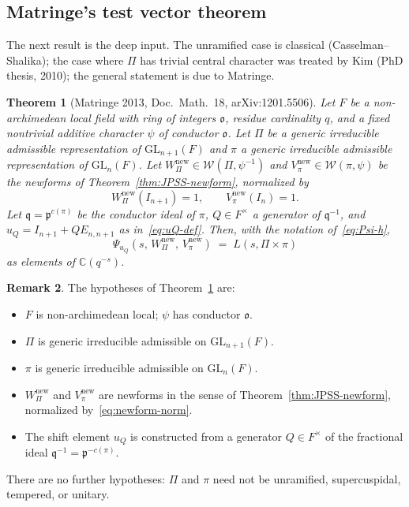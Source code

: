 \documentclass[12pt]{article}
\newtheorem{theorem}{Theorem}
\theoremstyle{definition}
\newtheorem{remark}[theorem]{Remark}
\begin{document}
\subsection{Matringe's test vector theorem}

The next result is the deep input. The unramified case is classical (Casselman--Shalika); the case where $\Pi$ has trivial central character was treated by Kim (PhD thesis, 2010); the general statement is due to Matringe.

\begin{theorem}[Matringe 2013, Doc.\ Math.\ 18, arXiv:1201.5506]\label{thm:Matringe}
Let $F$ be a non-archimedean local field with ring of integers $\mathfrak{o}$, residue cardinality $q$, and a fixed nontrivial additive character $\psi$ of conductor $\mathfrak{o}$. Let $\Pi$ be a generic irreducible admissible representation of $\mathrm{GL}_{n+1}(F)$ and $\pi$ a generic irreducible admissible representation of $\mathrm{GL}_n(F)$. Let $W_\Pi^{\mathrm{new}}\in\mathcal{W}(\Pi,\psi^{-1})$ and $V_\pi^{\mathrm{new}}\in\mathcal{W}(\pi,\psi)$ be the newforms of Theorem~\ref{thm:JPSS-newform}, normalized by
\begin{equation}\label{eq:newform-norm}
W_\Pi^{\mathrm{new}}(I_{n+1})=1,\qquad V_\pi^{\mathrm{new}}(I_n)=1.
\end{equation}
Let $\mathfrak{q}=\mathfrak{p}^{c(\pi)}$ be the conductor ideal of $\pi$, $Q\in F^\times$ a generator of $\mathfrak{q}^{-1}$, and $u_Q=I_{n+1}+Q E_{n,n+1}$ as in~\eqref{eq:uQ-def}. Then, with the notation of~\eqref{eq:Psi-h},
\begin{equation}\label{eq:Matringe-identity}
\Psi_{u_Q}\!\left(s,\,W_\Pi^{\mathrm{new}},\,V_\pi^{\mathrm{new}}\right)\;=\;L(s,\Pi\times\pi)
\end{equation}
as elements of $\mathbb{C}(q^{-s})$.
\end{theorem}

\begin{remark}\label{rem:Matringe-hypotheses}
The hypotheses of Theorem~\ref{thm:Matringe} are:
\begin{itemize}
\item[(H1)] $F$ is non-archimedean local; $\psi$ has conductor $\mathfrak{o}$.
\item[(H2)] $\Pi$ is generic irreducible admissible on $\mathrm{GL}_{n+1}(F)$.
\item[(H3)] $\pi$ is generic irreducible admissible on $\mathrm{GL}_n(F)$.
\item[(H4)] $W_\Pi^{\mathrm{new}}$ and $V_\pi^{\mathrm{new}}$ are newforms in the sense of Theorem~\ref{thm:JPSS-newform}, normalized by~\eqref{eq:newform-norm}.
\item[(H5)] The shift element $u_Q$ is constructed from a generator $Q\in F^\times$ of the fractional ideal $\mathfrak{q}^{-1}=\mathfrak{p}^{-c(\pi)}$.
\end{itemize}
There are no further hypotheses: $\Pi$ and $\pi$ need not be unramified, supercuspidal, tempered, or unitary.
\end{remark}
\end{document}
